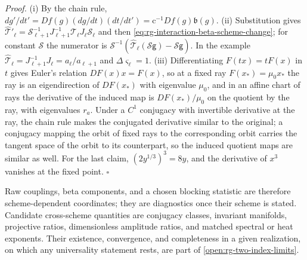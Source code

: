 \noindent\emph{Proof.}
(i) By the chain rule,
\(dg'/dt'=Df(g)(dg/dt)(dt/dt')=\mathrm c^{-1}Df(g)\mathfrak b(g)\). (ii)
Substitution gives
\(\widehat{\mathcal T}'_\ell=\mathcal S_{\ell+1}^{-1}J_{\ell+1}^{-1}\mathcal T_\ell
J_\ell\mathcal S_\ell\) and then \eqref{eq:rg-interaction-beta-scheme-change};
for constant \(\mathcal S\) the numerator is
\(\mathcal S^{-1}(\widehat{\mathcal T}_\ell(\mathcal S\mathsf g)-\mathcal S\mathsf g)\). In
the example \(\widehat{\mathcal T}_\ell=J_{\ell+1}^{-1}J_\ell=a_\ell/a_{\ell+1}\) and
\(\Delta\varsigma_\ell=1\). (iii) Differentiating \(F(tx)=tF(x)\) in \(t\)
gives Euler's relation \(DF(x)x=F(x)\), so at a fixed ray \(F(x_*)=\mu_0x_*\)
the ray is an eigendirection of \(DF(x_*)\) with eigenvalue \(\mu_0\), and in
an affine chart of rays the derivative of the induced map is \(DF(x_*)/\mu_0\)
on the quotient by the ray, with eigenvalues \(r_a\). Under a \(C^1\)
conjugacy with invertible derivative at the ray, the chain rule makes the
conjugated derivative similar to the original; a conjugacy mapping the orbit
of fixed rays to the corresponding orbit carries the tangent space of the
orbit to its counterpart, so the induced quotient maps are similar as well.
For the last claim, \((2y^{1/3})^3=8y\), and the derivative of \(x^3\) vanishes
at the fixed point. \(\square\)

Raw couplings, beta components, and a chosen blocking statistic are
therefore scheme-dependent coordinates; they are diagnostics once their scheme
is stated. Candidate cross-scheme quantities are conjugacy classes, invariant
manifolds, projective ratios, dimensionless amplitude ratios, and matched
spectral or heat exponents. Their existence, convergence, and completeness in a
given realization, on which any universality statement rests, are part of
\cref{open:rg-two-index-limits}.
